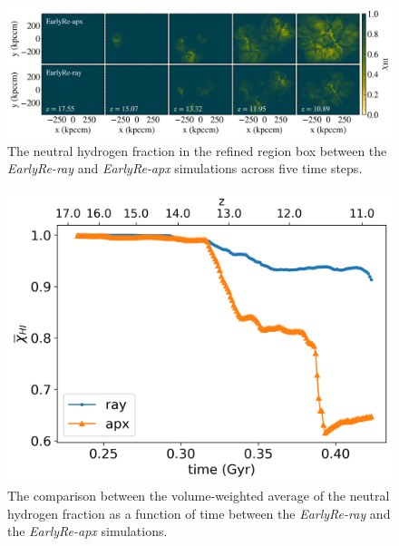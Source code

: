 \documentclass[linenumbers, twocolumn]{aastex631}
\begin{document}
\begin{figure}[tbph]
	\centering
	\includegraphics[width=\textwidth]{EarlyRe/neutralHfraction_comparison_multiple.png}
	\caption{The neutral hydrogen fraction in the refined region box between the \textit{EarlyRe-ray} and \textit{EarlyRe-apx} simulations across five time steps.}
	\label{fig:neutralHfrac_map}
\end{figure}

\begin{figure}
	\centering
	\includegraphics[width=0.95\columnwidth]{EarlyRe/neutralHfraction_evolution.png}
	\caption{The comparison between the volume-weighted average of the neutral hydrogen fraction as a function of time between the \textit{EarlyRe-ray} and the \textit{EarlyRe-apx} simulations.}
	\label{fig:neutralHfrac_evolution}
\end{figure}
\end{document}
